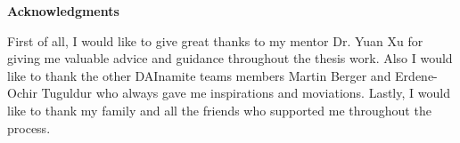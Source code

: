 \thispagestyle{empty}
\vspace*{1cm}

\begin{center}
  \LARGE \textbf{Acknowledgments}
\end{center}


\vspace*{0.5cm}

\noindent 
First of all, I would like to give great thanks to my mentor Dr. Yuan Xu for giving me valuable advice and guidance throughout the thesis work. Also I would like to thank the other DAInamite teams members Martin Berger and Erdene-Ochir Tuguldur who always gave me inspirations and moviations. Lastly, I would like to thank my family and all the friends who supported me throughout the process. 

